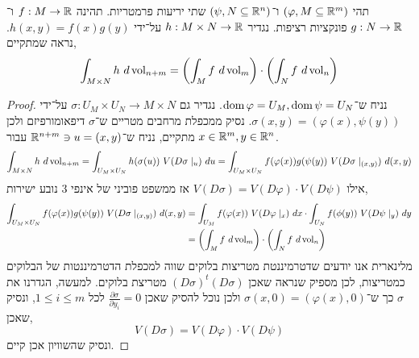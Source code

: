 \question{}
תהי $(\varphi, M \subseteq \mathbb{R}^m)$ ו־$(\psi, N \subseteq \mathbb{R}^n)$ שתי יריעות פרמטריות.
תהינה $f : M \to \mathbb{R}$ ו־$g : N \to \mathbb{R}$ פונקציות רציפות.
נגדיר $h : M \times N \to \mathbb{R}$ על־ידי $h(x, y) = f(x) g(y)$.
נראה שמתקיים,
\[
	\int_{M \times N} h\ d\operatorname{vol}_{n + m}
	= \left( \int_M f\ d\operatorname{vol}_m \right) \cdot \left( \int_N f\ d\operatorname{vol}_n \right)
\]
\begin{proof}
	נניח ש־$\operatorname{dom} \varphi = U_M, \operatorname{dom} \psi = U_N$.
	נגדיר גם $\sigma : U_M \times U_N \to M \times N$ על־ידי $\sigma(x, y) = (\varphi(x), \psi(y))$.
	נסיק ממכפלת מרחבים מטריים ש־$\sigma$ דיפאומורפיזם ולכן מתקיים, נניח ש־$\mathbb{R}^{n + m} \ni u = (x, y)$ עבור $x \in \mathbb{R}^m, y \in \mathbb{R}^n$.
	\[
		\int_{M \times N} h\ d\vol_{n + m}
		= \int_{U_M \times U_N} h(\sigma(u))\ V(D \sigma \mid_u)\ du
		= \int_{U_M \times U_N} f(\varphi(x)) g(\psi(y))\ V(D \sigma \mid_{(x, y)})\ d(x, y)
	\]
	אילו $V(D \sigma) = V(D \varphi) \cdot V(D \psi)$ אז ממשפט פוביני של אינפי 3 נובע ישירות,
	\begin{align*}
		\int_{U_M \times U_N} f(\varphi(x)) g(\psi(y))\ V(D \sigma \mid_{(x, y)})\ d(x, y)
		& = \int_{U_M} f(\varphi(x))\ V(D \varphi \mid_x)\ dx \cdot \int_{U_N} f(\phi(y))\ V(D \psi \mid_y)\ dy \\
		& = \left( \int_M f\ d\vol_m \right) \cdot \left( \int_N f\ d\vol_n \right)
	\end{align*}
	מלינארית אנו יודעים שדטרמיננטת מטריצות בלוקים שווה למכפלת הדטרמיננטות של הבלוקים כמטריצות, לכן מספיק שנראה שאכן ${(D \sigma)}^t (D \sigma)$ מטריצת בלוקים.
	למעשה, הגדרנו את $\sigma$ כך ש־$\sigma(x, 0) = (\varphi(x), 0)$ ולכן נוכל להסיק שאכן $\frac{\partial \sigma}{\partial y_i} = 0$ לכל $1 \le i \le m$, ונסיק שאכן,
	\[
		V(D \sigma) = V(D \varphi) \cdot V(D \psi)
	\]
	ונסיק שהשוויון אכן קיים.
\end{proof}


